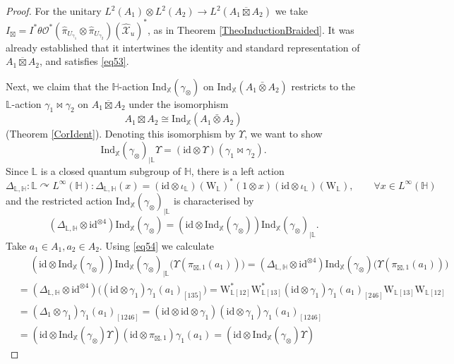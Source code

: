 \documentclass[reqno]{amsart}
\numberwithin{equation}{section}
\newcommand{\id}{\mathrm{id}}
\newcommand{\Ll}{\mathbb{L}}
\newcommand{\Hh}{\mathbb{H}}
\newcommand{\X}{\mathbb{X}}
\newcommand{\Ind}{\mathrm{Ind}}
\newcommand{\ov}{\overline}
\newcommand{\mc}{\mathcal}
\newcommand{\wh}{\widehat}
\newcommand{\HH}{\mathbb{H}}
\newcommand{\ww}{\mathrm{W}}
\begin{document}
\begin{proof}
For the unitary $L^2(A_1)\otimes L^2(A_2)\rightarrow L^2(A_1\ov\boxtimes A_2)$ we take $I_\boxtimes =I^*\theta\mc{O}^*
(\hat{\pi}_{U_{\gamma_1}}\otimes \hat{\pi}_{U_{\gamma_2}})(\wh{\mc{X}}_u)^*
$, as in Theorem \ref{TheoInductionBraided}. It was already established that it intertwines the identity and standard representation of $A_1\ov\boxtimes A_2$, and satisfies \eqref{eq53}.

Next, we claim that the $\HH$-action $\Ind_{\X}(\gamma_\otimes)$ on $\Ind_{\X}(A_1\bar\otimes A_2)$ restricts to the $\Ll$-action $\gamma_1\bowtie \gamma_2$ on $A_1\ov\boxtimes A_2$ under the isomorphism
\[
A_1\ov\boxtimes A_2\cong \Ind_{\X}(A_1\bar\otimes A_2)
\]
(Theorem \ref{CorIdent}). Denoting this isomorphism by $\Upsilon$, we want to show
\begin{equation}\label{eq57}
\Ind_{\X}(\gamma_\otimes)_{| \Ll}\Upsilon=(\id\otimes \Upsilon)(\gamma_1\bowtie \gamma_2).
\end{equation}
Since $\Ll$ is a closed quantum subgroup of $\HH$, there is a left action
\[
\Delta_{\Ll,\HH}\colon \Ll\curvearrowright L^{\infty}(\HH)\colon \Delta_{\Ll,\HH}(x)=(\id\otimes \iota_{\Ll})(\ww_{\Ll})^* (1\otimes x) (\id\otimes \iota_{\Ll})(\ww_{\Ll}),\qquad \forall x\in L^{\infty}(\HH)
\]
 and the restricted action $\Ind_{\X}(\gamma_\otimes)_{|\Ll}$ is characterised by
\[
(\Delta_{\Ll,\Hh}\otimes \id^{\otimes 4})\Ind_{\X}(\gamma_\otimes)=
(\id\otimes \Ind_{\X}(\gamma_\otimes)) \Ind_{\X}(\gamma_\otimes)_{| \Ll}.
\]
Take $a_1\in A_1,a_2\in A_2$. Using \eqref{eq54} we calculate
\begin{equation}\begin{split}\label{eq56}
&\quad\;
(\id\otimes \Ind_{\X}(\gamma_\otimes))
\Ind_{\X}(\gamma_\otimes)_{|\mathbb{L}}
\bigl(\Upsilon(\pi_{\boxtimes,1}(a_1)) \bigr)=
(\Delta_{\mathbb{L},\HH}\otimes \id^{\otimes 4})
\Ind_{\X}(\gamma_\otimes)
\bigl(\Upsilon(\pi_{\boxtimes,1}(a_1)) \bigr)\\
&=
(\Delta_{\mathbb{L},\HH}\otimes \id^{\otimes 4})
\bigl(
(\id\otimes \gamma_1)\gamma_1(a_1)_{[135]}\bigr)=
\ww_{\mathbb{L} [12]}^*\ww_{\mathbb{L} [13]}^*
(\id\otimes \gamma_1)\gamma_1(a_1)_{[246]}
\ww_{\mathbb{L} [13]}\ww_{\mathbb{L} [12]}\\
&=
(\Delta_1\otimes \gamma_1)\gamma_1(a_1)_{[1246]}=
(\id\otimes \id\otimes \gamma_1)(\id\otimes \gamma_1)
\gamma_1(a_1)_{[1246]}\\
&=
(\id\otimes \Ind_{\X}(\gamma_\otimes)\Upsilon)
(\id\otimes \pi_{\boxtimes,1})\gamma_1(a_1)=
(\id\otimes \Ind_{\X}(\gamma_\otimes)\Upsilon)

\end{split}
\end{equation}
\end{proof}
\end{document}
